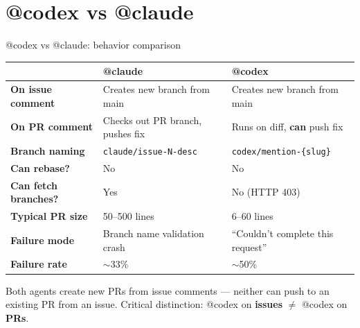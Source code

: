 \documentclass[aspectratio=169,10pt]{beamer}
\begin{document}
\section{@codex vs @claude}

\begin{frame}{@codex vs @claude: behavior comparison}
    \vspace{-0.4em}
    \begin{center}
    \renewcommand{\arraystretch}{1.2}
    {\footnotesize
    \begin{tabular}{@{}l p{5cm} p{5cm}@{}}
        \toprule
        & \textbf{@claude} & \textbf{@codex} \\
        \midrule
        \textbf{On issue comment} & Creates new branch from main & Creates new branch from main \\
        \textbf{On PR comment} & Checks out PR branch, pushes fix & Runs on diff, \textbf{can} push fix \\
        \textbf{Branch naming} & \texttt{claude/issue-N-desc} & \texttt{codex/mention-\{slug\}} \\
        \textbf{Can rebase?} & \textcolor{softred}{No} & \textcolor{softred}{No} \\
        \textbf{Can fetch branches?} & \textcolor{leangreen}{Yes} & \textcolor{softred}{No (HTTP 403)} \\
        \textbf{Typical PR size} & 50--500 lines & \textcolor{amber}{6--60 lines} \\
        \textbf{Failure mode} & Branch name validation crash & ``Couldn't complete this request'' \\
        \textbf{Failure rate} & $\sim$33\% & $\sim$50\% \\
        \bottomrule
    \end{tabular}
    }
    \end{center}
    \vspace{0.3em}
    \textcolor{dimwhite}{\footnotesize Both agents create new PRs from issue comments --- neither can push to an existing PR from an issue. Critical distinction: @codex on \textbf{issues} $\neq$ @codex on \textbf{PRs}.}
\end{frame}
\end{document}
